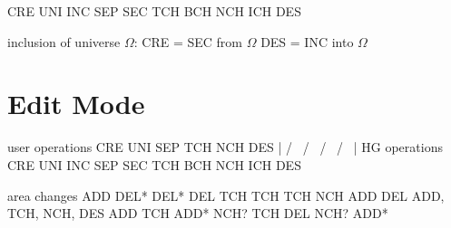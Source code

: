 CRE
UNI
INC
SEP
SEC
TCH
BCH
NCH
ICH
DES



inclusion of universe $\Omega$:
CRE = SEC from $\Omega$
DES = INC into $\Omega$



\section{Edit Mode} %
\label{sec:edit_mode}


user operations     CRE     UNI          SEP         TCH         NCH      DES
                     |      / \         /   \        /  \       /   \      |
HG operations       CRE   UNI   INC   SEP   SEC   TCH   BCH   NCH   ICH   DES

area changes        ADD   DEL*  DEL*  DEL   TCH   TCH   TCH   NCH   ADD   DEL
ADD, TCH, NCH, DES        ADD   TCH   ADD*  NCH?        TCH         DEL
                                NCH?        ADD*





